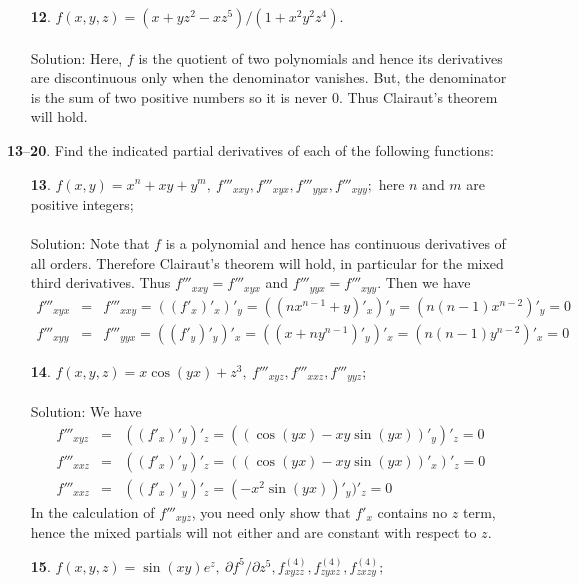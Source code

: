 \documentclass[12pt]{amsbook}
\begin{document}
\begin{enumerate}
\\
\item[{\small\bf 12}.] $f(x,y,z)=(x+yz^2-xz^5)/(1+x^2y^2z^4)$.
\\
\\
{\sc Solution}: Here, $f$ is the quotient of two polynomials and hence its derivatives are discontinuous only when the denominator vanishes. But, the denominator is the sum of two positive numbers so it is never $0$. Thus Clairaut's theorem will hold. 
\\
\end{enumerate}

\noindent
{\small {\bf 13}--{\bf 20}}. Find the indicated partial derivatives of each of the following functions:
\begin{enumerate}
\item[{\small\bf 13}.] $f(x,y)=x^n+xy+y^m, \ f'''_{xxy}, f'''_{xyx}, f'''_{yyx}, f'''_{xyy};$ here $n$ and $m$ are positive integers;
\\
\\
{\sc Solution}: Note that $f$ is a polynomial and hence has continuous derivatives of all orders. Therefore Clairaut's theorem will hold, in particular for the mixed third derivatives. Thus $f'''_{xxy}=f'''_{xyx}$ and $f'''_{yyx}=f'''_{xyy}$. Then we have
\begin{eqnarray*}
f'''_{xyx}&=&f'''_{xxy}=((f'_x)'_x)'_y=((nx^{n-1}+y)'_x)'_y=(n(n-1)x^{n-2})'_y=0 \\
f'''_{xyy}&=&f'''_{yyx}=((f'_y)'_y)'_x=((x+ny^{n-1})'_y)'_x=(n(n-1)y^{n-2})'_x=0 
\end{eqnarray*}
\item[{\small\bf 14}.] $f(x,y,z)=x\cos(yx)+z^3, \ f'''_{xyz}, f'''_{xxz}, f'''_{yyz}$;
\\
\\
{\sc Solution}: We have
\begin{eqnarray*}
f'''_{xyz}&=&((f'_x)'_y)'_z=((\cos(yx)-xy\sin(yx))'_y)'_z=0 \\
f'''_{xxz}&=&((f'_x)'_y)'_z=((\cos(yx)-xy\sin(yx))'_x)'_z=0 \\
f'''_{xxz}&=&((f'_x)'_y)'_z=(-x^2\sin(yx))'_y)'_z=0 
\end{eqnarray*}
In the calculation of $f'''_{xyz}$, you need only show that $f'_x$ contains no $z$ term, hence the mixed partials will not either and are constant with respect to $z$.
\\
\item[{\small\bf 15}.] $f(x,y,z)=\sin(xy)e^z, \ \partial f^5/\partial z^5, f^{(4)}_{xyzz}, f^{(4)}_{zyxz}, f^{(4)}_{zxzy}$;

\end{enumerate}
\end{document}
